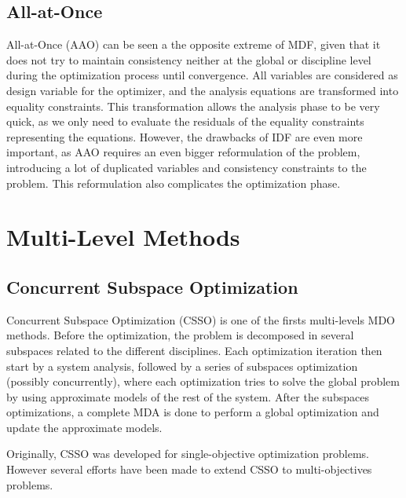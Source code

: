 \subsection{All-at-Once}

All-at-Once (AAO) can be seen a the opposite extreme of MDF, given that it does not try to maintain consistency neither at the global or discipline level during the optimization process until convergence.
All variables are considered as design variable for the optimizer, and the analysis equations are transformed into equality constraints.
This transformation allows the analysis phase to be very quick, as we only need to evaluate the residuals of the equality constraints representing the equations.
However, the drawbacks of IDF are even more important, as AAO requires an even bigger reformulation of the problem, introducing a lot of duplicated variables and consistency  constraints to the problem. This reformulation also complicates the optimization phase.

\section{Multi-Level Methods}

\subsection{Concurrent Subspace Optimization}

Concurrent Subspace Optimization (CSSO) is one of the firsts multi-levels MDO methods. Before the optimization, the problem is decomposed in several subspaces related to the different disciplines. Each optimization iteration then start by a system analysis, followed by a series of subspaces optimization (possibly concurrently), where each optimization tries to solve the global problem by using approximate models of the rest of the system. After the subspaces optimizations, a complete MDA is done to perform a global optimization and update the approximate models.

Originally, CSSO was developed for single-objective optimization problems. However several efforts have been made to extend CSSO to multi-objectives problems.

